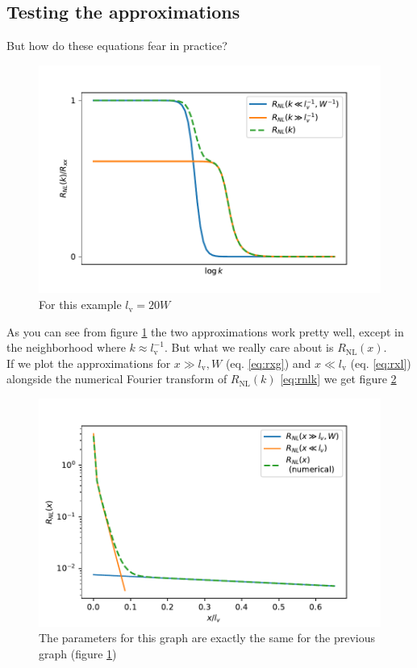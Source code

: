 \subsection{Testing the approximations}
But how do these equations fear in practice?
\begin{figure}[h!]
    \centering
    \includegraphics[width=\linewidth]{Immagini/rnl/2approx.pdf}
    \caption{For this example $l_\textrm{v}=20W$}
    \label{fig:rnl2approx}
\end{figure}
As you can see from figure \ref{fig:rnl2approx} the two approximations work pretty well, except in the neighborhood where $k\approx l_\textrm{v}^{-1}$. But what we really care about is $R_{\textrm{NL}}(x)$.\\
If we plot the approximations for $x\gg l_\textrm{v},W$ (eq. \ref{eq:rxg}) and $x\ll l_\textrm{v}$ (eq. \ref{eq:rxl}) alongside the numerical Fourier transform of $R_{\textrm{NL}}(k)$ \ref{eq:rnlk} we get figure \ref{fig:rnlx2approx}

\begin{figure}[h!]
    \centering
    \includegraphics[width=\linewidth]{Immagini/rnl/x2approx.pdf}
    \caption{The parameters for this graph are exactly the same for the previous graph (figure \ref{fig:rnl2approx})}
    \label{fig:rnlx2approx}
\end{figure}
